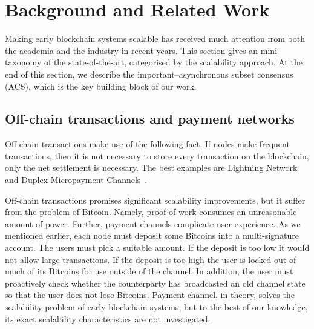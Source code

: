 
\section{Background and Related Work}
\label{sec:related}

Making early blockchain systems scalable has received much attention from both the academia and the industry in recent years.
This section gives an mini taxonomy of the state-of-the-art, categorised by the scalability approach.
At the end of this section,
we describe the important--asynchronous subset consensus (ACS),
which is the key building block of our work.

\subsection{Off-chain transactions and payment networks}
Off-chain transactions make use of the following fact.
If nodes make frequent transactions,
then it is not necessary to store every transaction on the blockchain,
only the net settlement is necessary.
The best examples are Lightning Network~\cite{lightningnetwork} and Duplex Micropayment Channels~\cite{decker2015fast}.

Off-chain transactions promises significant scalability improvements, but it suffer from the problem of Bitcoin.
Namely, proof-of-work consumes an unreasonable amount of power.
Further, payment channels complicate user experience.
As we mentioned earlier, each node must deposit some Bitcoins into a multi-signature account.
The users must pick a suitable amount.
If the deposit is too low it would not allow large transactions.
If the deposit is too high the user is locked out of much of its Bitcoins for use outside of the channel.
In addition, the user must proactively check whether the counterparty has broadcasted an old channel state so that the user does not lose Bitcoins.
Payment channel, in theory, solves the scalability problem of early blockchain systems,
but to the best of our knowledge, its exact scalability characteristics are not investigated.



